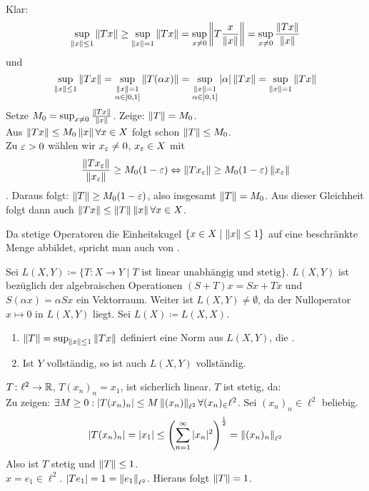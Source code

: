 \begin{beweis}
	Klar:
	\[ \sup_{\left\|x\right\|\leq 1}\left\|Tx\right\|\geq\sup_{\left\|x\right\|=1}\left\|Tx\right\|=\sup_{x\neq 0}\left\|T\frac{x}{\left\|x\right\|}\right\|=\sup_{x\neq 0}\frac{\left\|Tx\right\|}{\left\|x\right\|} \]
	und
	\[ \sup_{\left\|x\right\|\leq 1}\left\|Tx\right\|=\sup_{\substack{\left\|x\right\|=1\\\alpha\in]0,1]}}\left\|T(\alpha x)\right\|=\sup_{\substack{\left\|x\right\|=1\\\alpha\in]0,1]}}|\alpha|\left\|Tx\right\|=\sup_{\left\|x\right\|=1}\left\|Tx\right\| \]
	Setze $ M_0=\sup_{x\neq 0}\frac{\left\|Tx\right\|}{\left\|x\right\|} $. Zeige: $ \left\|T\right\|=M_0 $.\\
	Aus $ \left\|Tx\right\|\leq M_0\left\|x\right\|\forall x\in X $ folgt schon $ \left\|T\right\|\leq M_0 $.\\
	Zu $ \varepsilon>0 $ w\"ahlen wir $ x_\varepsilon\neq 0 $, $ x_\varepsilon\in X $ mit \[ \frac{\left\|Tx_\varepsilon\right\|}{\left\|x_\varepsilon\right\|}\geq M_0(1-\varepsilon) \Leftrightarrow\left\|Tx_\varepsilon\right\|\geq M_0(1-\varepsilon)\left\|x_\varepsilon\right\| \]. Daraus folgt: $ \left\|T\right\|\geq M_0(1-\varepsilon) $, also insgesamt $ \left\|T\right\|=M_0 $. Aus dieser Gleichheit folgt dann auch $ \left\|Tx\right\|\leq\left\|T\right\|\left\|x\right\|\forall x\in X $.
\end{beweis}
\begin{bemerkung*}
	Da stetige Operatoren die Einheitskugel $ \lbrace x\in X\mid\left\|x\right\|\leq 1\rbrace $ auf eine beschr\"ankte Menge abbildet, spricht man auch von .
\end{bemerkung*}
Sei $ L(X,Y)\coloneqq\lbrace T\colon X\rightarrow Y \mid T\text{ ist linear unabh\"angig und stetig}\rbrace$. $ L(X,Y) $ ist bez\"uglich der algebraischen Operationen $ (S+T)x=Sx+Tx $ und $ S(\alpha x)=\alpha Sx $ ein Vektorraum. Weiter ist $ L(X,Y)\neq\emptyset $, da der Nulloperator $ x\mapsto 0 $ in $ L(X,Y) $ liegt. Sei $ L(X)\coloneqq L(X,X) $.\\
\begin{satz}
	\bullshit
	\begin{enumerate}
		\item $ \left\|T\right\|=\sup_{\left\|x\right\|\leq 1}\left\|Tx\right\| $ definiert eine Norm aus $ L(X,Y) $, die .
		\item Ist $ Y $ vollst\"andig, so ist auch $ L(X,Y) $ vollst\"andig.
	\end{enumerate}
\end{satz}
\begin{beispiel*}
	$ T\colon\ell^2\rightarrow\mathbb{R} $, $ T(x_n)_n=x_1 $, ist sicherlich linear. $ T $ ist stetig, da:\\
	Zu zeigen: $ \exists M\geq 0:|T(x_n)_n|\leq M\left\|(x_n)\right\|_{\ell^2}\forall (x_n)_\in\ell^2 $. Sei $ (x_n)_n\in\ell^2 $ beliebig. 
	\[ |T(x_n)_n|=|x_1|\leq\left(\sum_{n=1}^{\infty}|x_n|^2\right)^\frac{1}{2}=\left\|(x_n)_n\right\|_{\ell^2} \]
	Also ist $ T $ stetig und $ \left\|T\right\|\leq 1 $.\\
	$ x=e_1\in\ell^2 $. $ |Te_1|=1=\left\|e_1\right\|_{\ell^2} $. Hieraus folgt $ \left\|T\right\|=1 $.
\end{beispiel*}
